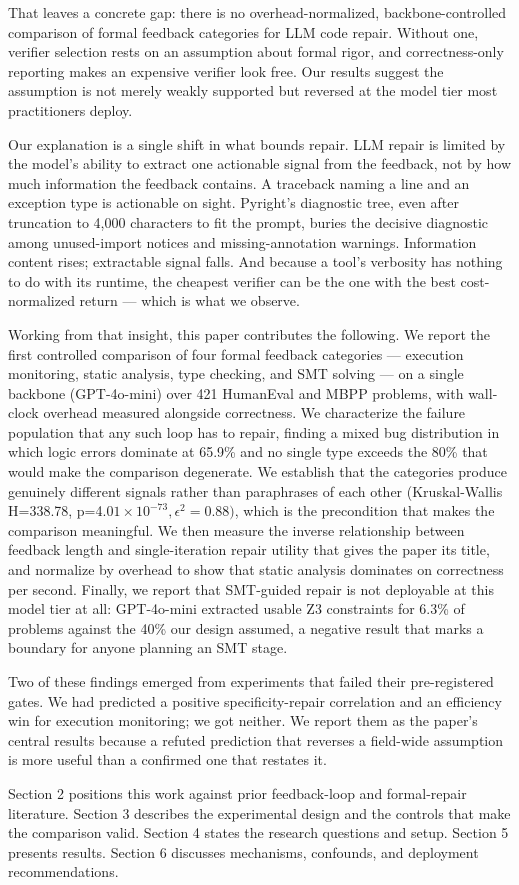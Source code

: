 That leaves a concrete gap: there is no overhead-normalized, backbone-controlled comparison of formal feedback categories for LLM code repair. Without one, verifier selection rests on an assumption about formal rigor, and correctness-only reporting makes an expensive verifier look free. Our results suggest the assumption is not merely weakly supported but reversed at the model tier most practitioners deploy.

Our explanation is a single shift in what bounds repair. LLM repair is limited by the model's ability to extract one actionable signal from the feedback, not by how much information the feedback contains. A traceback naming a line and an exception type is actionable on sight. Pyright's diagnostic tree, even after truncation to 4,000 characters to fit the prompt, buries the decisive diagnostic among unused-import notices and missing-annotation warnings. Information content rises; extractable signal falls. And because a tool's verbosity has nothing to do with its runtime, the cheapest verifier can be the one with the best cost-normalized return --- which is what we observe.

Working from that insight, this paper contributes the following. We report the first controlled comparison of four formal feedback categories --- execution monitoring, static analysis, type checking, and SMT solving --- on a single backbone (GPT-4o-mini) over 421 HumanEval and MBPP problems, with wall-clock overhead measured alongside correctness. We characterize the failure population that any such loop has to repair, finding a mixed bug distribution in which logic errors dominate at 65.9\% and no single type exceeds the 80\% that would make the comparison degenerate. We establish that the categories produce genuinely different signals rather than paraphrases of each other (Kruskal-Wallis H=338.78, p=4.$01\times 10^{-73}, \epsilon ^{2}=0.88)$, which is the precondition that makes the comparison meaningful. We then measure the inverse relationship between feedback length and single-iteration repair utility that gives the paper its title, and normalize by overhead to show that static analysis dominates on correctness per second. Finally, we report that SMT-guided repair is not deployable at this model tier at all: GPT-4o-mini extracted usable Z3 constraints for 6.3\% of problems against the 40\% our design assumed, a negative result that marks a boundary for anyone planning an SMT stage.

Two of these findings emerged from experiments that failed their pre-registered gates. We had predicted a positive specificity-repair correlation and an efficiency win for execution monitoring; we got neither. We report them as the paper's central results because a refuted prediction that reverses a field-wide assumption is more useful than a confirmed one that restates it.

Section 2 positions this work against prior feedback-loop and formal-repair literature. Section 3 describes the experimental design and the controls that make the comparison valid. Section 4 states the research questions and setup. Section 5 presents results. Section 6 discusses mechanisms, confounds, and deployment recommendations.

